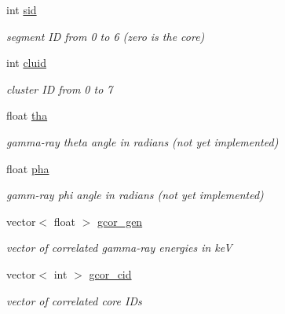\begin{DoxyCompactItemize}
int \hyperlink{classg__clx_a04f33012ec56804fca6978885732bc8f}{sid}
\begin{DoxyCompactList}\small\item\em segment ID from 0 to 6 (zero is the core) \end{DoxyCompactList}\item 
\mbox{\label{classg__clx_af057b9309517174aa3f45d0357b594e0}} 
int \hyperlink{classg__clx_af057b9309517174aa3f45d0357b594e0}{cluid}
\begin{DoxyCompactList}\small\item\em cluster ID from 0 to 7 \end{DoxyCompactList}\item 
\mbox{\label{classg__clx_a1add23d784b2694a2f680b855480d95f}} 
float \hyperlink{classg__clx_a1add23d784b2694a2f680b855480d95f}{tha}
\begin{DoxyCompactList}\small\item\em gamma-\/ray theta angle in radians (not yet implemented) \end{DoxyCompactList}\item 
\mbox{\label{classg__clx_affd7b8c1191e11bab79d77dfb4f16a63}} 
float \hyperlink{classg__clx_affd7b8c1191e11bab79d77dfb4f16a63}{pha}
\begin{DoxyCompactList}\small\item\em gamm-\/ray phi angle in radians (not yet implemented) \end{DoxyCompactList}\item 
\mbox{\label{classg__clx_a2db0e7ca55ebad82547b508b0dac451d}} 
vector$<$ float $>$ \hyperlink{classg__clx_a2db0e7ca55ebad82547b508b0dac451d}{gcor\+\_\+gen}
\begin{DoxyCompactList}\small\item\em vector of correlated gamma-\/ray energies in keV \end{DoxyCompactList}\item 
\mbox{\label{classg__clx_a6b6ebd8ff95dd7bcb5d8210419f77315}} 
vector$<$ int $>$ \hyperlink{classg__clx_a6b6ebd8ff95dd7bcb5d8210419f77315}{gcor\+\_\+cid}
\begin{DoxyCompactList}\small\item\em vector of correlated core I\+Ds \end{DoxyCompactList}\item 

\end{DoxyCompactItemize}
